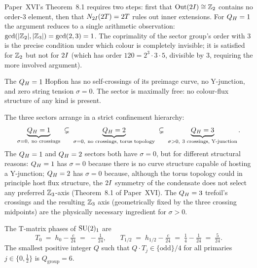 \begin{remark}[Why colour exclusion is easier for $\QH=1$]
\label{P17:rem:colour_stronger}
Paper~XVI's Theorem~8.1 %
requires two steps: first that $\mathrm{Out}(2I)\cong\mathbb{Z}_2$ contains no
order-$3$ element, then that $N_{2I}(2T)=2T$ rules out inner
extensions. For $\QH=1$ the argument reduces to a single arithmetic
observation: $\gcd(|\mathbb{Z}_2|,|\mathbb{Z}_3|)=\gcd(2,3)=1$. The coprimality of the
sector group's order with $3$ is the precise condition under which colour
is completely invisible; it is satisfied for $\mathbb{Z}_2$ but not for $2I$
(which has order $120=2^3\cdot3\cdot5$, divisible by $3$, requiring
the more involved argument).
\end{remark}

\begin{proposition}[No confinement in $\QH=1$]
\label{P17:prop:qh1_noconfinement}
The $\QH=1$ Hopfion has no self-crossings of its preimage curve, no
Y-junction, and zero string tension $\sigma=0$. The sector is
maximally free: no colour-flux structure of any kind is present.
\end{proposition}

\begin{remark}
\label{P17:rem:confinement_hierarchy}
The three sectors arrange in a strict confinement hierarchy:
\[
  \underbrace{Q_H=1}_{\sigma=0,\ \text{no crossings}}
  \;\subsetneq\;
  \underbrace{Q_H=2}_{\sigma=0,\ \text{no crossings, torus topology}}
  \;\subsetneq\;
  \underbrace{Q_H=3}_{\sigma>0,\ \text{3 crossings, Y-junction}}.
\]
The $\QH=1$ and $Q_H=2$ sectors both have $\sigma=0$, but for
different structural reasons: $\QH=1$ has $\sigma=0$ because there is
no curve structure capable of hosting a Y-junction; $Q_H=2$ has
$\sigma=0$ because, although the torus topology could in principle host
flux structure, the $2I$ symmetry of the condensate does not select
any preferred $\mathbb{Z}_3$-axis (Theorem~8.1 %
of Paper~XVI). The $Q_H=3$ trefoil's crossings and the resulting
$\mathbb{Z}_3$ axis (geometrically fixed by the three crossing midpoints)
are the physically necessary ingredient for $\sigma>0$.
\end{remark}

\begin{proposition}[$Q_{\mathrm{group}}=6$ for $\SU(2)_1$]
\label{P17:prop:qh1_Qgroup}
The T-matrix phases of $\SU(2)_1$ are
\[
  T_0 \;=\; h_0 - \tfrac{c}{24} \;=\; -\tfrac{1}{24},
  \qquad
  T_{1/2} \;=\; h_{1/2} - \tfrac{c}{24} \;=\; \tfrac{1}{4} - \tfrac{1}{24} \;=\; \tfrac{5}{24}.
\]
The smallest positive integer $Q$ such that $Q\cdot T_j\in\{\text{odd}\}/4$
for all primaries $j\in\{0,\tfrac12\}$ is $Q_{\mathrm{group}}=6$.
\end{proposition}

